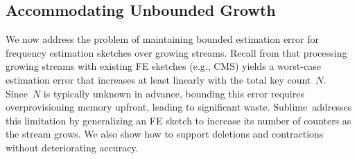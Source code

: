 \documentclass[sigconf]{acmart}
\newcommand{\sketch}{Sublime}
\begin{document}
\subsection{Accommodating Unbounded Growth}\label{sec:accommodating_unknown_stream_lengths}
We now address the problem of maintaining bounded estimation error for frequency estimation sketches over growing streams.
Recall from  that processing growing streams with existing FE sketches (e.g., CMS) yields a worst-case estimation error that increases at least linearly with the total key count~$N$.
Since~$N$ is typically unknown in advance, bounding this error requires overprovisioning memory upfront, leading to significant waste.
\sketch\ addresses this limitation by generalizing an FE sketch to increase its number of counters as the stream grows.
We also show how to support deletions and contractions without deteriorating accuracy.
\end{document}
